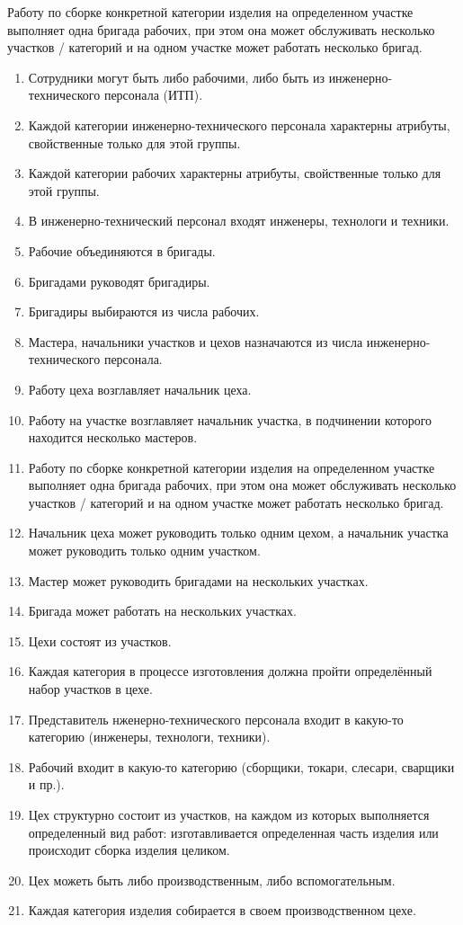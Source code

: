Работу по сборке конкретной категории изделия на определенном участке выполняет одна бригада рабочих, при этом она может обслуживать несколько участков / категорий и на одном участке может работать несколько бригад.

\begin{enumerate}

    \item Сотрудники могут быть либо рабочими, либо быть из инженерно-технического персонала (ИТП).
    \item Каждой категории инженерно-технического персонала характерны атрибуты, свойственные только для этой группы.
    \item Каждой категории рабочих характерны атрибуты, свойственные только для этой группы.
    \item В инженерно-технический персонал входят инженеры, технологи и техники.
    \item Рабочие объединяются в бригады.
    \item Бригадами руководят бригадиры.
    \item Бригадиры выбираются из числа рабочих.
    \item Мастера, начальники участков и цехов назначаются из числа инженерно-технического персонала.
    \item Работу цеха возглавляет начальник цеха.
    \item Работу на участке возглавляет начальник участка, в подчинении которого находится несколько мастеров.
    \item Работу по сборке конкретной категории изделия на определенном участке выполняет одна бригада рабочих, при этом она может обслуживать несколько участков / категорий и на одном участке может работать несколько бригад.
    \item Начальник цеха может руководить только одним цехом, а начальник участка может руководить только одним участком.
    \item Мастер может руководить бригадами на нескольких участках.
    \item Бригада может работать на нескольких участках.
    \item Цехи состоят из участков.
    \item Каждая категория в процессе изготовления должна пройти определённый набор участков в цехе.

    \item Представитель нженерно-технического персонала входит в какую-то категорию (инженеры, технологи, техники).
    \item Рабочий входит в какую-то категорию (сборщики, токари, слесари, сварщики и пр.).
    \item Цех структурно состоит из участков, на каждом из которых выполняется определенный вид работ: изготавливается определенная часть изделия или происходит сборка изделия целиком.
    \item Цех можеть быть либо производственным, либо вспомогательным.
    \item Каждая категория изделия собирается в своем производственном цехе.

\end{enumerate}

